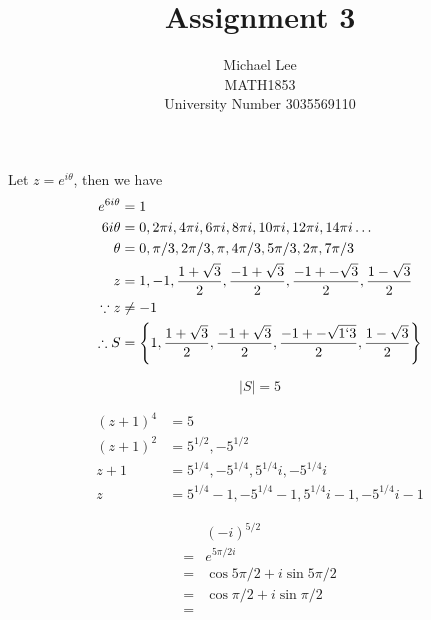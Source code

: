 \documentclass[12pt]{article}
\newenvironment{answer}[2][Answer]{\begin{trivlist}
    \item[\hskip \labelsep {\bfseries #1}\hskip \labelsep {\bfseries #2.}]}{\end{trivlist}}
\begin{document}
    
    
    
\title{Assignment 3}%
\author{Michael Lee\\ %
	MATH1853 \\
	University Number 3035569110 
} %
    
    
\maketitle
\begin{answer}{Q. 1a}
\hfill \break
Let $z=e^{i\theta}$, then we have
\begin{align}
    e^{6i\theta} &= 1 \\
    6i\theta &= 0,2\pi i, 4\pi i, 6\pi i,8\pi i, 10\pi i, 12\pi i, 14\pi i \hdots \\
    \theta &=0,\pi /3,2\pi /3 ,\pi, 4\pi /3, 5\pi /3, 2\pi ,7\pi /3 \\
    z&= 1,-1,\frac {1+\sqrt{3}} 2,\frac {-1+\sqrt{3}} 2,\frac {-1+-\sqrt{3}} 2,\frac {1-\sqrt{3}} 2 \\
    \because z &\neq -1 \\
    \therefore S&=\left\{1,\frac {1+\sqrt{3}} 2,\frac {-1+\sqrt{3}} 2,\frac {-1+-\sqrt{ 1`3}} 2,\frac {1-\sqrt{3}} 2\right\}
\end{align}
\end{answer}
\begin{answer}{Q. 1b}
    $$|S|=5$$
\end{answer}
\begin{answer}{Q. 2}
    \begin{align}
        \left(z+1\right)^4 &= 5 \\
        \left(z+1\right)^2 &= 5^{1/2} , -5^{1/2} \\
        z+1&=5^{1/4}, -5^{1/4},5^{1/4}i, -5^{1/4}i \\
        z&=5^{1/4}-1, -5^{1/4}-1,5^{1/4}i-1, -5^{1/4}i-1 
    \end{align}
\end{answer}
\begin{answer}{Q. 3}
    \begin{align}
        & \left(-i\right)^{5/2} \\
        =& e^{5\pi /2 i}\\
        =& \cos {5\pi /2} + i\sin {5\pi /2} \\
        =& \cos {\pi /2} + i\sin {\pi /2} \\
        =& 
    \end{align}
\end{answer}
\end{document}

